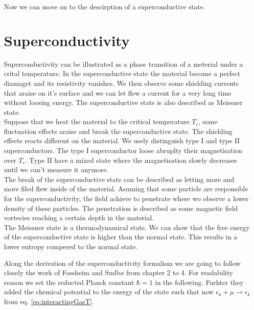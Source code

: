 \documentclass[../main.tex]{subfile}
\begin{document}
Now we can move on to the descirption of a superconductive state.\\
\section{Superconductivity}
Superconductivity can be illustrated as a phase transition of a meterial under a crital temperature. In the superconductive state the material 
become a perfect diamaget and its resistivity vanishes. We then observe some shielding currents that araise on it's surface
and we can let flew a current for a very long time without loosing energy. The superconductive state is also described as Meissner state.\\ 

Suppose that we heat the material to the critical temperature $T_c$, some fluctuation effects araise and break the superconductive state.
The shielding effects reacts different on the material. We usely distinguish type I and type II superconductors. The type I superconductor
loose abruplty their magnetisation over $T_c$. Type II have a mixed state where the magnetisation slowly decreases until we can't measure it anymore.\\

The break of the superconductive state can be described as letting more and more filed 
flew inside of the material. Asuming that some particle are responsible for the superconductivity, the field achieve to penetrate where wo observe 
a lower density of these particles. The penetration is described as some magnetic field vortecies reaching a certain depth in the material.\\

The Meissner state is a thermodynamical state. We can show that the free energy of the superconductive state is higher than the normal state. 
This results in a lower entropy compered to the normal state.

Along the derivation of the superconductivity formalism we are going to follow closely the work of Fossheim and Sudbø \cite{FossheimSudbo2004} from chapter 2 to 4.
For readability reason we set the reducted Planck constant $\hbar = 1$ in the following. Furhter they added the chemical potential to the energy of the state such
that now $\epsilon_k + \mu \rightarrow \epsilon_k $ from eq. \ref{eq:interactingGasT}. \\
\end{document}
